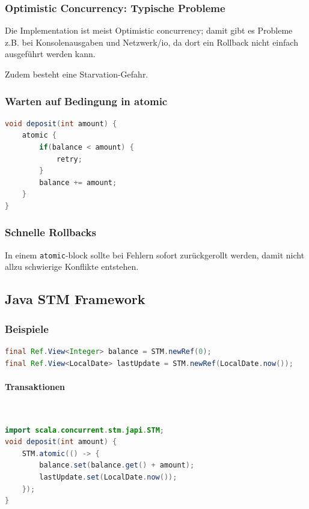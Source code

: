 \subsubsection{Optimistic Concurrency: Typische Probleme}

Die Implementation ist meist Optimistic concurrency; damit gibt es Probleme z.B. bei Konsolenausgaben und Netzwerk/io, da dort ein Rollback nicht einfach ausgeführt werden kann.

Zudem besteht eine Starvation-Gefahr.


\subsubsection{Warten auf Bedingung in atomic}

\begin{lstlisting}[language=java]
void deposit(int amount) {
	atomic {
		if(balance < amount) {
			retry;
		}
		balance += amount;
	}
}
\end{lstlisting}



\subsubsection{Schnelle Rollbacks}

In einem \lstinline|atomic|-block sollte bei Fehlern sofort zurückgerollt werden, damit nicht allzu schwierige Konflikte entstehen.


\subsection{Java STM Framework}

\subsubsection{Beispiele}

\begin{lstlisting}[language=Java]
final Ref.View<Integer> balance = STM.newRef(0);
final Ref.View<LocalDate> lastUpdate = STM.newRef(LocalDate.now());
\end{lstlisting}

\paragraph{Transaktionen} \hfill \\
\begin{lstlisting}[language=Java]
import scala.concurrent.stm.japi.STM;
void deposit(int amount) {
	STM.atomic(() -> {
		balance.set(balance.get() + amount);
		lastUpdate.set(LocalDate.now());
	});
}
\end{lstlisting}

